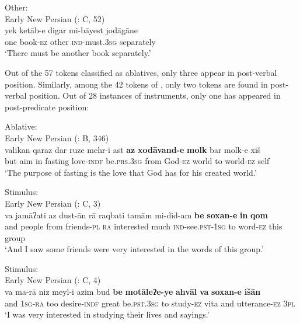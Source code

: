 \documentclass[output=paper,colorlinks,citecolor=brown,draftmode]{langscibook}
\begin{document}
\ea\label{ENP:ex:4}
Other: \\
Early New Persian (\citealt{parizadeh_persian_2022}: C, 52) \\
\gll yek ketāb-e digar mi-bāyest jodāgāne \\
one book\textsc{-ez} other \textsc{ind-}must\textsc{.3sg} separately \\
\glt `There must be another book separately.' 
\z

Out of the 57 tokens classified as ablatives, only three appear in post-verbal position. Similarly, among the 42 tokens of , only two tokens are found in post-verbal position. Out of 28 instances of instruments, only one has appeared in post-predicate position:

\ea\label{ENP:ex:5}
Ablative: \\
Early New Persian (\citealt{parizadeh_persian_2022}: B, 346) \\
\gll valikan qaraz dar ruze mehr-i ast \textbf{az} \textbf{xodāvand-e} \textbf{molk} bar molk-e xiš \\
but aim in fasting love\textsc{-indf} be\textsc{.prs.3sg} from God\textsc{-ez} world to world\textsc{-ez} self \\
\glt `The purpose of fasting is the love that God has for his created world.'
\z

\ea\label{ENP:ex:6}
Stimulus: \\
Early New Persian (\citealt{parizadeh_persian_2022}: C, 3) \\
\gll va jamāʔati az dust-ān rā raqbati tamām mi-did-am \textbf{be} \textbf{soxan-e} \textbf{in} \textbf{qom} \\
and people from friends\textsc{-pl} \textsc{ra} interested much \textsc{ind-}see\textsc{.pst-1sg} to word\textsc{-ez} this group \\
\glt `And I saw some friends were very interested in the words of this group.'
\z

\ea\label{ENP:ex:7}
Stimulus: \\
Early New Persian (\citealt{parizadeh_persian_2022}: C, 4) \\
\gll va ma-rā niz meyl-i azim bud \textbf{be} \textbf{motāleʔe-ye} \textbf{ahvāl} \textbf{va} \textbf{soxan-e} \textbf{išān} \\
and \textsc{1sg-ra} too desire\textsc{-indf} great be\textsc{.pst.3sg} to study\textsc{-ez} vita and utterance\textsc{-ez} \textsc{3pl} \\
\glt `I was very interested in studying their lives and sayings.' 
\z
\end{document}
